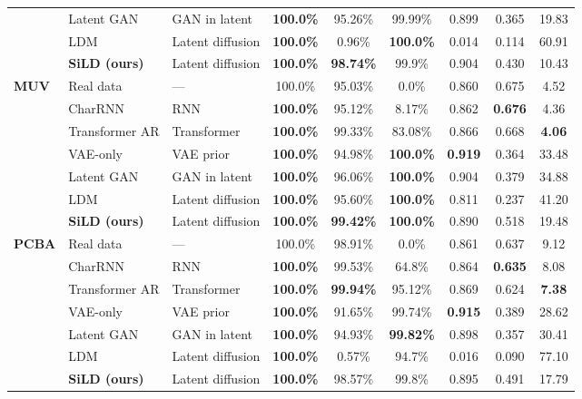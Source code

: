 \begin{table}[t]
{\begin{tabular}{lllcccccc}
 & Latent GAN     & GAN in latent    & \textbf{100.0\%} & 95.26\% & 99.99\% & 0.899 & 0.365 & 19.83 \\
 & LDM            & Latent diffusion & \textbf{100.0\%} & 0.96\%  & \textbf{100.0\%} & 0.014 & 0.114 & 60.91 \\
 & \textbf{SiLD (ours)} & Latent diffusion & \textbf{100.0\%} & \textbf{98.74\%} & 99.9\% & 0.904 & 0.430 & 10.43 \\
\midrule
\multirow{7}{*}{\textbf{MUV}}
 & Real data      & ---              & 100.0\% & 95.03\% & 0.0\%   & 0.860 & 0.675 & 4.52 \\
\cmidrule{2-9}
 & CharRNN        & RNN              & \textbf{100.0\%} & 95.12\% & 8.17\%  & 0.862 & \textbf{0.676} & 4.36 \\
 & Transformer AR & Transformer      & \textbf{100.0\%} & 99.33\% & 83.08\% & 0.866 & 0.668 & \textbf{4.06} \\
\cmidrule{2-9}
 & VAE-only       & VAE prior        & \textbf{100.0\%} & 94.98\% & \textbf{100.0\%} & \textbf{0.919} & 0.364 & 33.48 \\
 & Latent GAN     & GAN in latent    & \textbf{100.0\%} & 96.06\% & \textbf{100.0\%} & 0.904 & 0.379 & 34.88 \\
 & LDM            & Latent diffusion & \textbf{100.0\%} & 95.60\% & \textbf{100.0\%} & 0.811 & 0.237 & 41.20 \\
 & \textbf{SiLD (ours)} & Latent diffusion & \textbf{100.0\%} & \textbf{99.42\%} & \textbf{100.0\%} & 0.890 & 0.518 & 19.48 \\
\midrule
\multirow{7}{*}{\textbf{PCBA}}
 & Real data      & ---              & 100.0\% & 98.91\% & 0.0\%   & 0.861 & 0.637 & 9.12 \\
\cmidrule{2-9}
 & CharRNN        & RNN              & \textbf{100.0\%} & 99.53\% & 64.8\%  & 0.864 & \textbf{0.635} & 8.08 \\
 & Transformer AR & Transformer      & \textbf{100.0\%} & \textbf{99.94\%} & 95.12\% & 0.869 & 0.624 & \textbf{7.38} \\
\cmidrule{2-9}
 & VAE-only       & VAE prior        & \textbf{100.0\%} & 91.65\% & 99.74\% & \textbf{0.915} & 0.389 & 28.62 \\
 & Latent GAN     & GAN in latent    & \textbf{100.0\%} & 94.93\% & \textbf{99.82\%} & 0.898 & 0.357 & 30.41 \\
 & LDM            & Latent diffusion & \textbf{100.0\%} & 0.57\%  & 94.7\%  & 0.016 & 0.090 & 77.10 \\
 & \textbf{SiLD (ours)} & Latent diffusion & \textbf{100.0\%} & 98.57\% & 99.8\% & 0.895 & 0.491 & 17.79 \\
\bottomrule
\end{tabular}%
}
\end{table}

